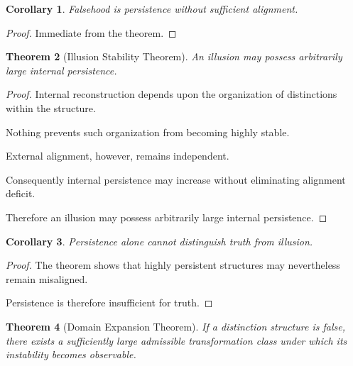\documentclass[12pt,oneside]{article}
\newtheorem{theorem}{Theorem}[section] \newtheorem{lemma}[theorem]{Lemma} \newtheorem{proposition}[theorem]{Proposition} \newtheorem{corollary}[theorem]{Corollary}
\theoremstyle{definition}
\begin{document}
\begin{corollary}

Falsehood is persistence without sufficient alignment.

\end{corollary}

\begin{proof}

Immediate from the theorem.

\end{proof}

\begin{theorem}[Illusion Stability Theorem]

An illusion may possess arbitrarily large internal persistence.

\end{theorem}

\begin{proof}

Internal reconstruction depends upon the organization of distinctions within the structure.

Nothing prevents such organization from becoming highly stable.

External alignment, however, remains independent.

Consequently internal persistence may increase without eliminating alignment deficit.

Therefore an illusion may possess arbitrarily large internal persistence.

\end{proof}

\begin{corollary}

Persistence alone cannot distinguish truth from illusion.

\end{corollary}

\begin{proof}

The theorem shows that highly persistent structures may nevertheless remain misaligned.

Persistence is therefore insufficient for truth.

\end{proof}

\begin{theorem}[Domain Expansion Theorem]

If a distinction structure is false, there exists a sufficiently large admissible transformation class under which its instability becomes observable.

\end{theorem}
\end{document}
